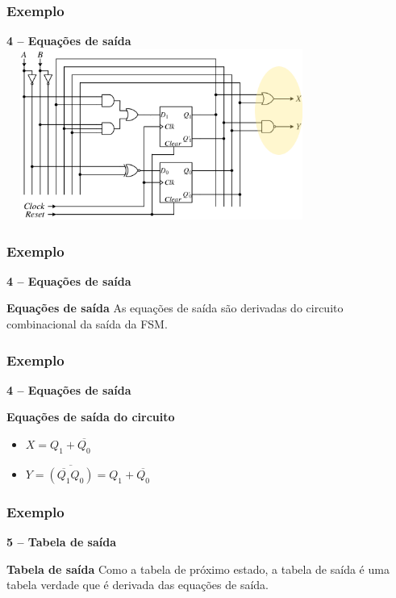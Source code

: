 \documentclass{beamer}
\begin{document}
\begin{frame}
  \frametitle{Exemplo}
  \textbf{4 – Equações de saída}
   \includegraphics[height = 2.2in, width = 4in]{EXEMPLO_ANALISE_4.png}
\end{frame}

\begin{frame}
  \frametitle{Exemplo}
  \textbf{4 – Equações de saída}
   \begin{block}{\textbf{Equações de saída}}
    As equações de saída são derivadas do circuito combinacional da saída da FSM.
   \end{block}
\end{frame}

\begin{frame}
  \frametitle{Exemplo}
  \textbf{4 – Equações de saída}
   \begin{block}{\textbf{Equações de saída do circuito}}
     \begin{itemize}
      \item $X = Q_1 + \overline{Q_0}$
      \item $Y = \overline{(\overline{Q_1}Q_0)} = Q_1 + \overline{Q_0} $ 
     \end{itemize}
   \end{block}
\end{frame}

\begin{frame}
  \frametitle{Exemplo}
  \textbf{5 – Tabela de saída}
   \begin{block}{\textbf{Tabela de saída}}
    Como a tabela de próximo estado, a tabela de saída é uma tabela verdade que é derivada das equações de saída. 
   \end{block}
\end{frame}
\end{document}
